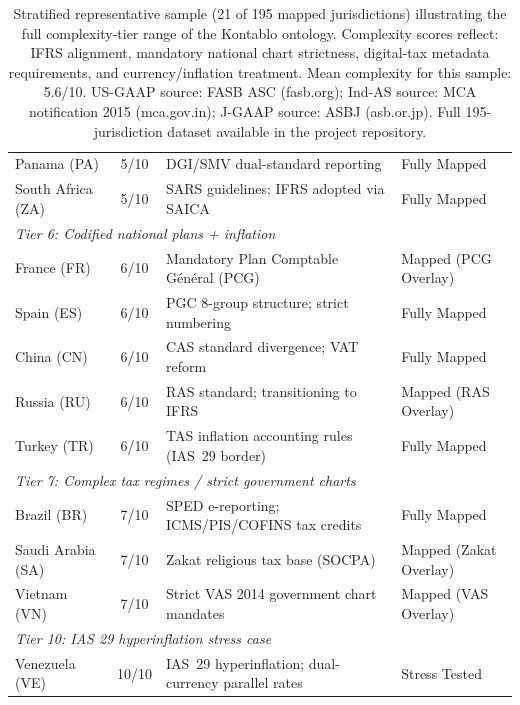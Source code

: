 \begin{table}[htbp]
{\begin{tabular}{lcll}
Panama (PA)         & 5/10 & DGI/SMV dual-standard reporting & Fully Mapped \\
South Africa (ZA)   & 5/10 & SARS guidelines; IFRS adopted via SAICA & Fully Mapped \\
\midrule
\multicolumn{4}{l}{\textit{Tier 6: Codified national plans + inflation}} \\
France (FR)         & 6/10 & Mandatory Plan Comptable G\'{e}n\'{e}ral (PCG) & Mapped (PCG Overlay) \\
Spain (ES)          & 6/10 & PGC 8-group structure; strict numbering & Fully Mapped \\
China (CN)          & 6/10 & CAS standard divergence; VAT reform & Fully Mapped \\
Russia (RU)         & 6/10 & RAS standard; transitioning to IFRS & Mapped (RAS Overlay) \\
Turkey (TR)         & 6/10 & TAS inflation accounting rules (IAS~29 border) & Fully Mapped \\
\midrule
\multicolumn{4}{l}{\textit{Tier 7: Complex tax regimes / strict government charts}} \\
Brazil (BR)         & 7/10 & SPED e-reporting; ICMS/PIS/COFINS tax credits & Fully Mapped \\
Saudi Arabia (SA)   & 7/10 & Zakat religious tax base (SOCPA) & Mapped (Zakat Overlay) \\
Vietnam (VN)        & 7/10 & Strict VAS 2014 government chart mandates & Mapped (VAS Overlay) \\
\midrule
\multicolumn{4}{l}{\textit{Tier 10: IAS 29 hyperinflation stress case}} \\
Venezuela (VE)      & 10/10 & IAS~29 hyperinflation; dual-currency parallel rates & Stress Tested \\
\bottomrule
\end{tabular}%
}
\caption{Stratified representative sample (21 of 195 mapped jurisdictions) illustrating the full complexity-tier range of the Kontablo ontology. Complexity scores reflect: IFRS alignment, mandatory national chart strictness, digital-tax metadata requirements, and currency/inflation treatment. Mean complexity for this sample: 5.6/10. US-GAAP source: FASB ASC (fasb.org); Ind-AS source: MCA notification 2015 (mca.gov.in); J-GAAP source: ASBJ (asb.or.jp). Full 195-jurisdiction dataset available in the project repository.}
\label{tab:jurisdictions}
\end{table}

